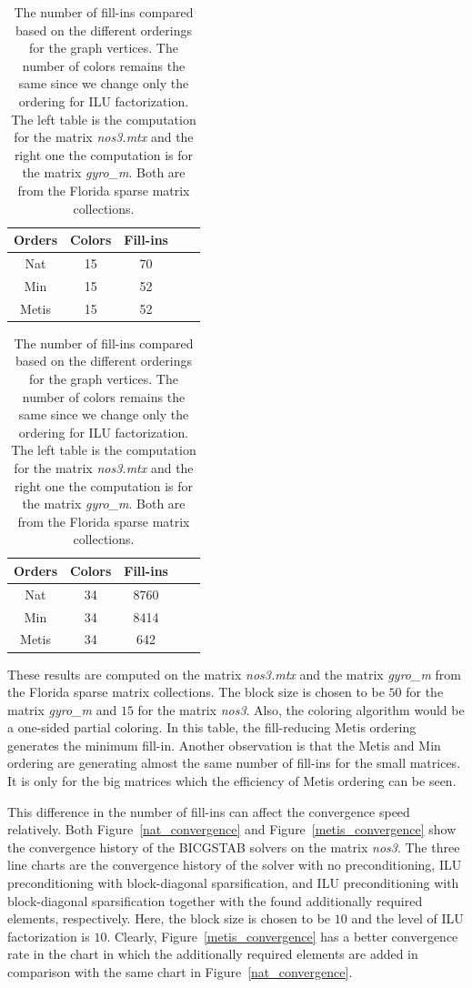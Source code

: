 \documentclass[12pt, twoside]{book}
\begin{document}
\begin{table}
\begin{tabular}{|c|c|c|c|c|}
\hline
Orders & Colors & Fill-ins\\\hline
Nat & 15 & 70\\\hline
Min & 15 & 52\\\hline
Metis & 15 & 52\\\hline
\end{tabular}
\hfill
\begin{tabular}{|c|c|c|c|c|}
\hline
Orders & Colors & Fill-ins \\\hline
Nat & 34 & 8760 \\\hline
Min & 34 & 8414 \\\hline
Metis & 34 & 642\\\hline
\end{tabular}
\caption{The number of fill-ins compared based on the different orderings
for the graph vertices. The number of colors remains the same since we change only the ordering for
ILU factorization.
The left table is the computation for the matrix \textit{nos3.mtx}
and the right one the computation is for the matrix \textit{gyro\_m}.
Both are from the Florida sparse matrix collections.}
\label{ilu-effect}
\end{table}

These results are computed on the matrix \textit{nos3.mtx}
and the matrix \textit{gyro\_m} from
the Florida sparse matrix collections. The block size is
chosen to be $50$ for the matrix \textit{gyro\_m} and $15$ for
the matrix \textit{nos3}. Also, the coloring algorithm would be a one-sided
partial coloring. In this table, the fill-reducing Metis ordering
generates the minimum fill-in.
Another observation is that the Metis and Min ordering are generating almost the same
number of fill-ins for the small matrices.
It is only for the big matrices which the efficiency of Metis ordering can be seen.

This difference in the number of fill-ins can affect the convergence speed
relatively. Both Figure~\ref{nat_convergence}
and Figure~\ref{metis_convergence} show
the convergence history of the BICGSTAB solvers on the matrix \textit{nos3}.
The three line charts are the convergence history of the solver with
no preconditioning, ILU preconditioning with block-diagonal sparsification,
and ILU preconditioning with block-diagonal sparsification together with the found
additionally required elements, respectively.
Here, the block size is chosen to be $10$ and the level of ILU factorization
is $10$.
Clearly, Figure~\ref{metis_convergence} has a better convergence rate in the chart
in which the additionally required elements are added in comparison with the same
chart in Figure~\ref{nat_convergence}.
\end{document}
